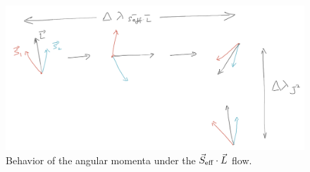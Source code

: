 \begin{figure}
  \centering
  \includegraphics[width=0.8\linewidth]{seffdl_flow}
  \caption{ Behavior of the angular momenta under 
  the $\vec{S}_{\text{eff}}\cdot \vec{L}$ flow.
    \vspace{-1.em}
  }
  \label{seffdl_flow}
\end{figure}
















